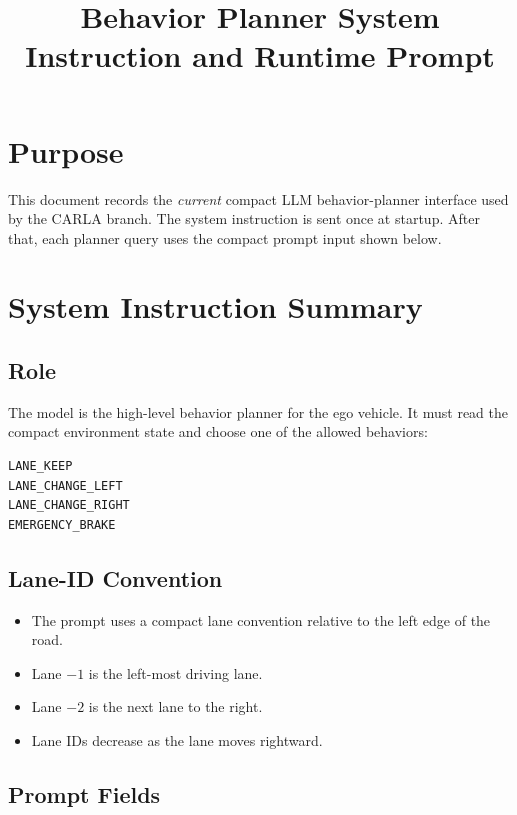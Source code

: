 \documentclass[11pt]{article}
\title{Behavior Planner System Instruction and Runtime Prompt}
\author{}
\date{}
\begin{document}
\maketitle

\section{Purpose}

This document records the \emph{current} compact LLM behavior-planner interface
used by the CARLA branch. The system instruction is sent once at startup. After
that, each planner query uses the compact prompt input shown below.

\section{System Instruction Summary}

\subsection{Role}

The model is the high-level behavior planner for the ego vehicle. It must read
the compact environment state and choose one of the allowed behaviors:

\begin{lstlisting}[style=codestyle]
LANE_KEEP
LANE_CHANGE_LEFT
LANE_CHANGE_RIGHT
EMERGENCY_BRAKE
\end{lstlisting}

\subsection{Lane-ID Convention}

\begin{itemize}
    \item The prompt uses a compact lane convention relative to the left edge
    of the road.
    \item Lane $-1$ is the left-most driving lane.
    \item Lane $-2$ is the next lane to the right.
    \item Lane IDs decrease as the lane moves rightward.
\end{itemize}

\subsection{Prompt Fields}
\end{document}
